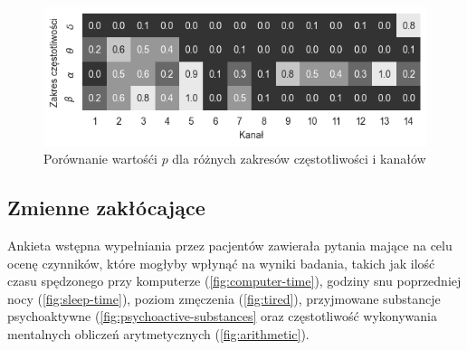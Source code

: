 \documentclass{./assets/wfis}
\begin{document}
\begin{figure}[h!]
    \centering
    \includegraphics[width=0.75\columnwidth]{thesis/assets/thinking_vs_waiting_pvalue.png}
    \caption{Porównanie wartośći $p$ dla różnych zakresów częstotliwości i kanałów}
    \label{fig:thinking-vs-waiting-pvalue}
\end{figure}





\subsection{Zmienne zakłócające}\label{zmiennne-zaklucajace}
Ankieta wstępna wypełniania przez pacjentów zawierała pytania mające na celu ocenę czynników, które mogłyby wpłynąć na wyniki badania, takich jak ilość czasu spędzonego przy komputerze (\autoref{fig:computer-time}), godziny snu poprzedniej nocy (\autoref{fig:sleep-time}), poziom zmęczenia (\autoref{fig:tired}), przyjmowane substancje psychoaktywne (\autoref{fig:psychoactive-substances} oraz częstotliwość wykonywania mentalnych obliczeń arytmetycznych (\autoref{fig:arithmetic}).
\end{document}
